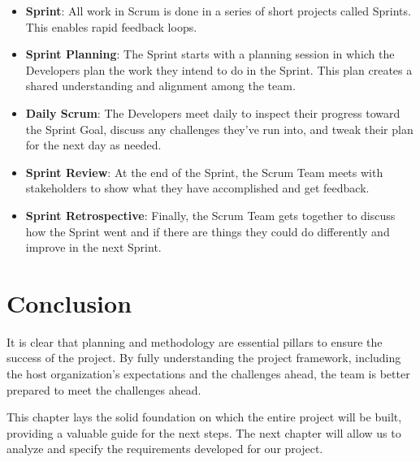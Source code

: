 \begin{itemize}
    \item \textbf{Sprint}: All work in Scrum is done in a series of short projects called Sprints. This enables rapid feedback loops.
    
    \item \textbf{Sprint Planning}: The Sprint starts with a planning session in which the Developers plan the work they intend to do in the Sprint. This plan creates a shared understanding and alignment among the team.
    
    \item \textbf{Daily Scrum}: The Developers meet daily to inspect their progress toward the Sprint Goal, discuss any challenges they've run into, and tweak their plan for the next day as needed.
    
    \item \textbf{Sprint Review}: At the end of the Sprint, the Scrum Team meets with stakeholders to show what they have accomplished and get feedback.
    
    \item \textbf{Sprint Retrospective}: Finally, the Scrum Team gets together to discuss how the Sprint went and if there are things they could do differently and improve in the next Sprint.
\end{itemize}

\section*{Conclusion}

It is clear that planning and methodology are essential pillars to ensure the success of the project. By fully understanding the project framework, including the host organization's expectations and the challenges ahead, the team is better prepared to meet the challenges ahead.

This chapter lays the solid foundation on which the entire project will be built, providing a valuable guide for the next steps. The next chapter will allow us to analyze and specify the requirements developed for our project. 